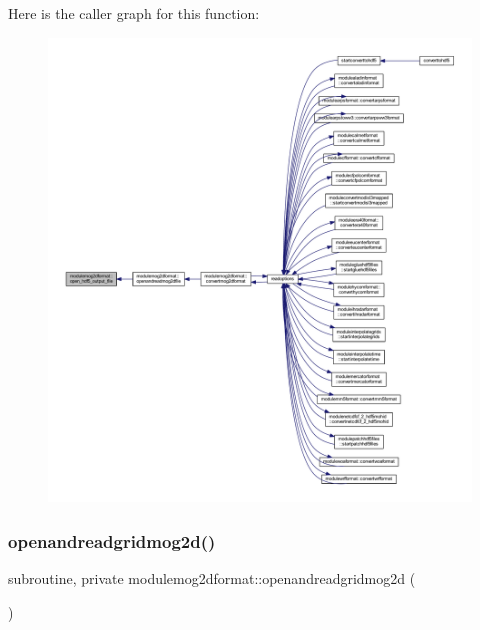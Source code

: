 Here is the caller graph for this function\+:\nopagebreak
\begin{figure}[H]
\begin{center}
\leavevmode
\includegraphics[width=350pt]{namespacemodulemog2dformat_af04a77a337b8d48c2fd163ae89586914_icgraph}
\end{center}
\end{figure}
\mbox{\label{namespacemodulemog2dformat_aae3ca34111cfb5aa29845bcbac420694}} 
\subsubsection{\texorpdfstring{openandreadgridmog2d()}{openandreadgridmog2d()}}
{\footnotesize\ttfamily subroutine, private modulemog2dformat\+::openandreadgridmog2d (\begin{DoxyParamCaption}{ }\end{DoxyParamCaption})\hspace{0.3cm}{\ttfamily [private]}}

